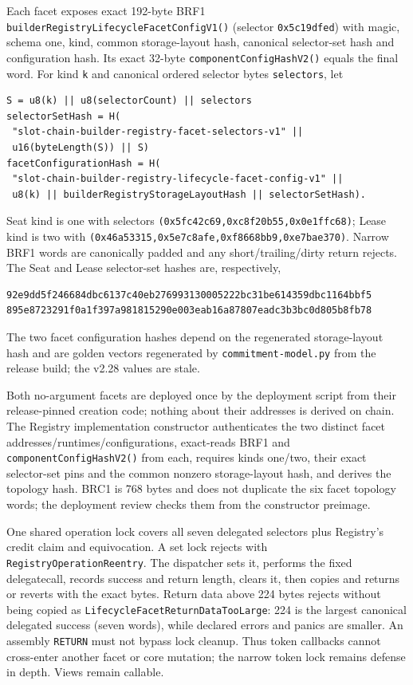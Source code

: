 \documentclass[a4paper,11pt]{article}
\newcommand{\code}[1]{\nolinkurl{#1}}
\begin{document}
Each facet exposes exact 192-byte BRF1
\code{builderRegistryLifecycleFacetConfigV1()} (selector
\code{0x5c19dfed}) with magic, schema one, kind,
common storage-layout hash, canonical selector-set hash and configuration hash.
Its exact 32-byte \code{componentConfigHashV2()} equals the final word.  For
kind \code{k} and canonical ordered selector bytes \code{selectors}, let
\begin{verbatim}
S = u8(k) || u8(selectorCount) || selectors
selectorSetHash = H(
 "slot-chain-builder-registry-facet-selectors-v1" ||
 u16(byteLength(S)) || S)
facetConfigurationHash = H(
 "slot-chain-builder-registry-lifecycle-facet-config-v1" ||
 u8(k) || builderRegistryStorageLayoutHash || selectorSetHash).
\end{verbatim}
Seat kind is one with selectors
\code{(0x5fc42c69,0xc8f20b55,0x0e1ffc68)}; Lease kind is two with
\code{(0x46a53315,0x5e7c8afe,0xf8668bb9,0xe7bae370)}.  Narrow BRF1
words are canonically padded and any short/trailing/dirty return rejects.
The Seat and Lease selector-set hashes are, respectively,
\begin{verbatim}
92e9dd5f246684dbc6137c40eb276993130005222bc31be614359dbc1164bbf5
895e8723291f0a1f397a981815290e003eab16a87807eadc3b3bc0d805b8fb78
\end{verbatim}
The two facet configuration hashes depend on the regenerated storage-layout
hash and are golden vectors regenerated by \code{commitment-model.py} from the
release build; the v2.28 values are stale.

Both no-argument facets are deployed once by the deployment script from their
release-pinned creation code; nothing about their addresses is derived on
chain.  The Registry implementation constructor authenticates the two distinct
facet addresses/runtimes/configurations, exact-reads BRF1 and
\code{componentConfigHashV2()} from each, requires kinds one/two, their exact
selector-set pins and the common nonzero storage-layout hash, and derives the
topology hash.  BRC1 is 768 bytes and does not duplicate the six facet
topology words; the deployment review checks them from the constructor
preimage.

One shared operation lock covers all seven delegated selectors plus Registry's
credit claim and equivocation.  A set lock rejects with
\code{RegistryOperationReentry}.  The dispatcher sets it, performs the fixed
delegatecall, records success and return length, clears it, then copies and
returns or reverts with the exact bytes.  Return data above 224 bytes rejects
without being copied as \code{LifecycleFacetReturnDataTooLarge}: 224 is the
largest canonical delegated success (seven words), while declared errors and
panics are smaller.  An assembly \code{RETURN} must not bypass lock cleanup.
Thus token callbacks cannot cross-enter another facet or core mutation; the
narrow token lock remains defense in depth.  Views remain callable.
\end{document}
